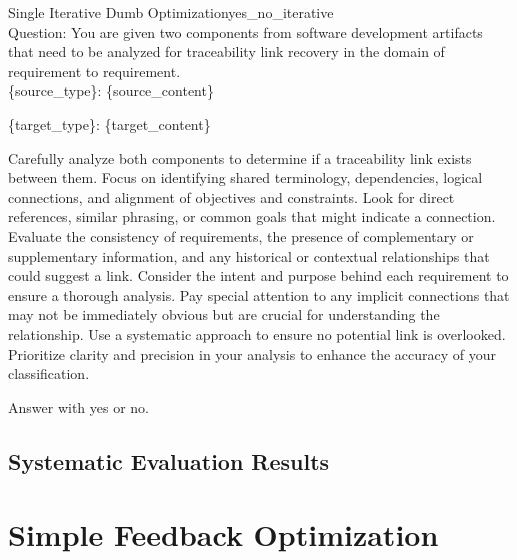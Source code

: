 \begin{prompt}{\KISS Single Iterative Dumb Optimization}{yes_no_iterative}\\
    Question: You are given two components from software development artifacts that need to be analyzed for traceability link recovery in the domain of requirement to requirement.\\
    
    \{source\_type\}: \tripplequote\{source\_content\}\tripplequote

    \{target\_type\}: \tripplequote\{target\_content\}\tripplequote

    Carefully analyze both components to determine if a traceability link exists between them. Focus on identifying shared terminology, dependencies, logical connections, and alignment of objectives and constraints. Look for direct references, similar phrasing, or common goals that might indicate a connection. Evaluate the consistency of requirements, the presence of complementary or supplementary information, and any historical or contextual relationships that could suggest a link. Consider the intent and purpose behind each requirement to ensure a thorough analysis. Pay special attention to any implicit connections that may not be immediately obvious but are crucial for understanding the relationship. Use a systematic approach to ensure no potential link is overlooked. Prioritize clarity and precision in your analysis to enhance the accuracy of your classification.

    Answer with \textquotesingle{}yes\textquotesingle{} or \textquotesingle{}no\textquotesingle{}.
    
\end{prompt}

\subsection{Systematic Evaluation Results}

\begin{table}
    \centering
    \renewcommand{\arraystretch}{1.4}
    
    \renewcommand{\arraystretch}{1}
    \caption{Naive prompt optimization approach prompting the model to optimize the classification prompt}
    \label{tab:naive_optimization}
\end{table}

\newpage
\section{Simple Feedback Optimization}
\label{sec:Evaluation:simple_feedback_optimization}


